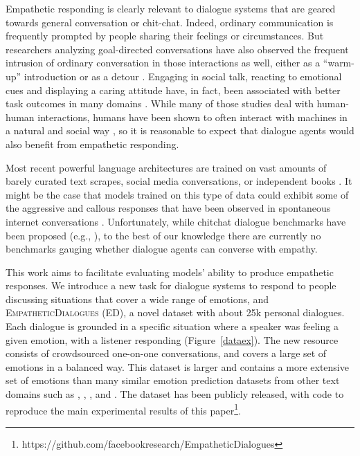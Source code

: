 \documentclass[11pt,a4paper]{article}
\newcommand\datasetname{\textsc{EmpatheticDialogues}}
\begin{document}
Empathetic responding is clearly relevant to dialogue systems that are geared towards general conversation or chit-chat. Indeed, ordinary communication is frequently prompted by people sharing their feelings or circumstances. 
But researchers analyzing goal-directed conversations have also observed the frequent intrusion of ordinary conversation in those interactions as well, either as a ``warm-up'' introduction 
or as a detour 
\citep{levinson2000study,heritage2005conversation}. Engaging in social talk, reacting to emotional cues and displaying a caring attitude have, in fact, been associated with better task outcomes in many domains \citep{wentzel1997student,levinson2000study,bickmore2001relational,kim2004effects,fraser2018spoken}. While many of those studies deal with human-human interactions, humans have been shown to often interact with machines in a natural and social way \citep{reeves1996media,lee2010receptionist}, so it is reasonable to expect that dialogue agents would also benefit from empathetic responding.

Most recent powerful language architectures are trained on vast amounts of barely curated text scrapes, social media conversations, or independent books \citep{ritter2010unsupervised,personachat,mazare2018training,bertppr,liu2019multi,radford2019language}.
It might be the case that models trained on this type of data could exhibit some of the aggressive and callous responses that have been observed in spontaneous internet conversations \citep{anderson2015ask}. Unfortunately, while chitchat dialogue benchmarks have been proposed (e.g., \citealp{dinan2019second}),
to the best of our knowledge there are currently no benchmarks gauging whether dialogue agents can converse with empathy.



This work aims to facilitate evaluating models' ability to produce empathetic responses. We introduce a new task for dialogue systems to respond to people discussing situations that cover a wide range of emotions, and \datasetname{} (ED), a novel dataset with about 25k personal dialogues. Each dialogue is grounded in a specific situation where a speaker was feeling a given emotion, with a listener responding (Figure~\ref{dataex}). The new resource consists of crowdsourced one-on-one conversations, and covers a large set of emotions in a balanced way. 
This dataset is larger and contains a more extensive set of emotions than many similar emotion prediction datasets from other text domains such as \citet{ISEAR}, \citet{SemEval2007}, \citet{Mohammad2018SemEval2018T1}, and \citet{gupta2017sentiment}. The dataset has been publicly released, with code to reproduce the main experimental results of this paper\footnote{https://github.com/facebookresearch/EmpatheticDialogues}.
\end{document}
